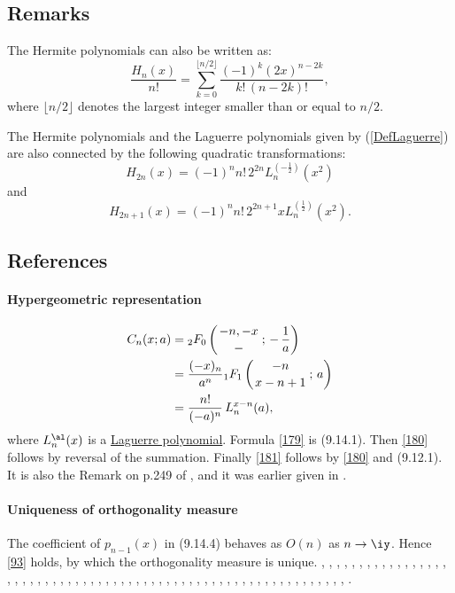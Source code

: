 \documentclass[envcountchap,graybox]{svmono}
\newcommand{\hyp}[5]{\mbox{}_{#1}{F}_{#2}
\left(\genfrac{}{}{0pt}{}{#3}{#4}\,;\,#5\right)}
\begin{document}
\subsection*{Remarks}
The Hermite polynomials can also be written as:
$$\frac{H_n(x)}{n!}=\sum_{k=0}^{\lfloor n/2\rfloor}
\frac{(-1)^k(2x)^{n-2k}}{k!\,(n-2k)!},$$
where $\lfloor n/2\rfloor$ denotes the largest integer smaller than or equal to $n/2$.

\noindent
The Hermite polynomials and the Laguerre polynomials given by (\ref{DefLaguerre}) are also
connected by the following quadratic transformations:
$$H_{2n}(x)=(-1)^nn!\,2^{2n}L_n^{(-\frac{1}{2})}(x^2)$$
and
$$H_{2n+1}(x)=(-1)^nn!\,2^{2n+1}xL_n^{(\frac{1}{2})}(x^2).$$

\subsection*{References}
\label{sec9.14}
%
\paragraph{Hypergeometric representation}
\begin{align}
C_n(x;a)&=\hyp20{-n,-x}-{-\,\frac1a}
\label{179}\\
&=\frac{(-x)_n}{a^n} \hyp11{-n}{x-n+1}a
\label{180}\\
&=\frac{n!}{(-a)^n}\,L_n^{x-n}(a),
\label{181}
\end{align}
where $L_n^\al(x)$ is a
\hyperref[sec9.12]{Laguerre polynomial}.
Formula \eqref{179} is (9.14.1). Then \eqref{180} follows by reversal
of the summation. Finally \eqref{181} follows by \eqref{180} and
(9.12.1). It is also the Remark on p.249 of , and it
was earlier given in .
%
\paragraph{Uniqueness of orthogonality measure}
The coefficient of $p_{n-1}(x)$ in (9.14.4) behaves as $O(n)$ as $n\to\iy$.
Hence \eqref{93} holds, by which the orthogonality measure is unique.
%
\cite{Abram}, \cite{NAlSalam66}, \cite{AlSalam90}, \cite{AlSalamChihara72},
\cite{AlSalamChihara76}, \cite{AndrewsAskey85}, \cite{AndrewsAskeyRoy}, \cite{Area+I}, 
\cite{Askey68}, \cite{Askey75}, \cite{Askey89I}, \cite{AskeyGasper76}, \cite{AskeyWilson85}, 
\cite{Azor}, \cite{Berg}, \cite{BilodeauII}, \cite{Brafman51}, \cite{Brafman57II}, 
\cite{Brenke}, \cite{CarlitzSrivastava}, \cite{ChenSrivastava}, \cite{Chihara78}, 
\cite{Cohen}, \cite{Danese}, \cite{DetteStudden92}, \cite{DetteStudden95}, \cite{Doha2004I},
\cite{Erdelyi+}, \cite{Faldey}, \cite{Gawronski87}, \cite{Gawronski93}, \cite{Gillis+},
\cite{Godoy+}, \cite{Grad}, \cite{Ismail74}, \cite{Ismail2005II}, \cite{IsmailStanton97},
\cite{Koekoek2000}, \cite{Koorn88}, \cite{Krasikov2004}, \cite{Kwon+}, \cite{LabelleYehIII},
\cite{Lesky95II}, \cite{Lesky96}, \cite{LewanowiczI}, \cite{LopezTemme99}, \cite{Mathai},
\cite{Meixner}, \cite{Nikiforov+}, \cite{NikiforovUvarov}, \cite{Olver}, \cite{Pittaluga},
\cite{Rainville}, \cite{SainteViennot}, \cite{Srivastava71}, \cite{SrivastavaMathur},
\cite{Szego75}, \cite{Temme}, \cite{TemmeLopez2000}, \cite{Trickovic}, \cite{Viennot},
\cite{Weisner59}, \cite{Wyman}.
\end{document}
